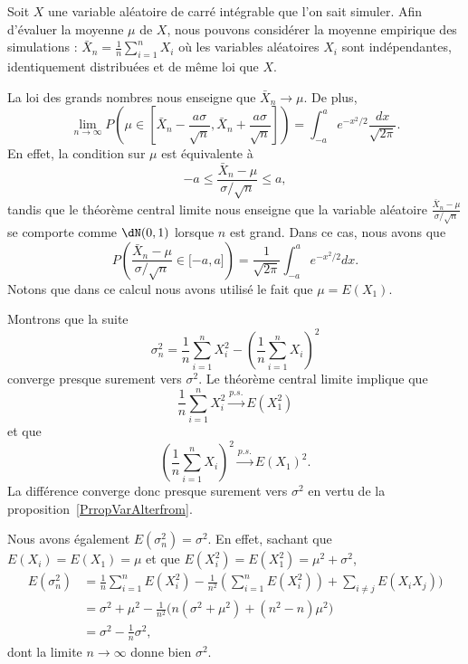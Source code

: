 \begin{example}
	Soit \( X\) une variable aléatoire de carré intégrable que l'on sait simuler. Afin d'évaluer la moyenne \( \mu\) de \( X\), nous pouvons considérer la moyenne empirique des simulations : \( \bar X_n=\frac{1}{ n }\sum_{i=1}^nX_i\) où les variables aléatoires \( X_i\) sont indépendantes, identiquement distribuées et de même loi que \( X\).

	La loi des grands nombres nous enseigne que \( \bar X_n\to\mu\). De plus,
	\begin{equation}
		\lim_{n\to \infty} P\left( \mu\in\left[ \bar X_n-\frac{ a\sigma }{ \sqrt{n} },\bar X_n+\frac{ a\sigma }{ \sqrt{n} } \right] \right)=\int_{-a}^a e^{-x^2/2}\frac{ dx }{ \sqrt{2\pi} }.
	\end{equation}
	En effet, la condition sur \( \mu\) est équivalente à
	\begin{equation}
		-a\leq \frac{ \bar X_n-\mu }{ \sigma/\sqrt{n} }\leq a,
	\end{equation}
	tandis que le théorème central limite nous enseigne que la variable aléatoire \( \frac{ \bar X_n-\mu }{ \sigma/\sqrt{n} }\) se comporte comme \( \dN(0,1)\) lorsque \( n\) est grand. Dans ce cas, nous avons que
	\begin{equation}
		P\left( \frac{ \bar X_n-\mu }{ \sigma/\sqrt{n} }\in\mathopen[ -a , a \mathclose] \right)=\frac{1}{ \sqrt{2\pi} }\int_{-a}^a e^{-x^2/2}dx.
	\end{equation}
	Notons que dans ce calcul nous avons utilisé le fait que \( \mu=E(X_1)\).

	Montrons que la suite
	\begin{equation}
		\sigma_n^2=\frac{1}{ n }\sum_{i=1}^nX_i^2-\left( \frac{1}{ n }\sum_{i=1}^nX_i \right)^2
	\end{equation}
	converge presque surement vers \( \sigma^2\). Le théorème central limite implique que
	\begin{equation}
		\frac{1}{ n }\sum_{i=1}^nX_i^2\stackrel{p.s.}{\longrightarrow} E(X_1^2)
	\end{equation}
	et que
	\begin{equation}
		\left( \frac{1}{ n }\sum_{i=1}^nX_i \right)^2\stackrel{p.s.}{\longrightarrow}E(X_1)^2.
	\end{equation}
	La différence converge donc presque surement vers \( \sigma^2\) en vertu de la proposition~\ref{PrropVarAlterfrom}.

	Nous avons également \( E(\sigma_n^2)=\sigma^2\). En effet, sachant que \( E(X_i)=E(X_1)=\mu\) et que \( E(X_i^2)=E(X_1^2)=\mu^2+\sigma^2\),
	\begin{subequations}
		\begin{align}
			E(\sigma_n^2) & =\frac{1}{ n }\sum_{i=1}^nE(X_i^2)-\frac{1}{ n^2 }\left( \sum_{i=1}^nE(X_i^2) \right)+\sum_{i\neq j}E(X_iX_j)) \\
			              & =\sigma^2+\mu^2-\frac{1}{ n^2 }\big( n(\sigma^2+\mu^2)+(n^2-n)\mu^2 \big)                                      \\
			              & =\sigma^2-\frac{1}{ n }\sigma^2,
		\end{align}
	\end{subequations}
	dont la limite \( n\to\infty\) donne bien \( \sigma^2\).


\end{example}
